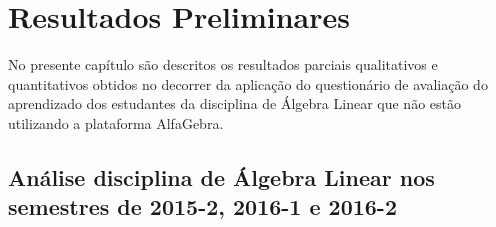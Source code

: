 \chapter{Resultados Preliminares}
\label{cap:resultados}
\noindent No presente capítulo são descritos os resultados parciais qualitativos e quantitativos obtidos no decorrer da aplicação do questionário de avaliação do aprendizado dos estudantes da disciplina de Álgebra Linear que não estão utilizando a plataforma AlfaGebra.

\section{Análise disciplina de Álgebra Linear nos semestres de 2015-2, 2016-1 e 2016-2}

\label{disciplina_3_ultimos_semestre}

